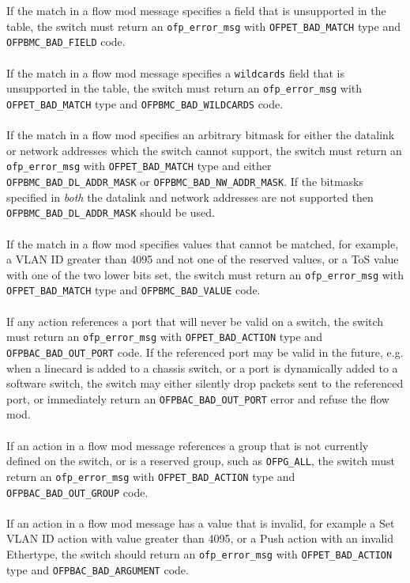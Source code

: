 \documentclass[10pt]{article}
\begin{document}
\\\\
If the match in a flow mod message specifies a field that is unsupported in the table, the switch must return an \verb|ofp_error_msg| with \verb|OFPET_BAD_MATCH| type and \verb|OFPBMC_BAD_FIELD| code.
\\\\
If the match in a flow mod message specifies a \verb|wildcards| field that is unsupported in the table, the switch must return an \verb|ofp_error_msg| with \verb|OFPET_BAD_MATCH| type and \verb|OFPBMC_BAD_WILDCARDS| code.
\\\\
If the match in a flow mod specifies an arbitrary bitmask for either the datalink or network addresses which the switch cannot support, the switch must return an \verb|ofp_error_msg| with \verb|OFPET_BAD_MATCH| type and either \verb|OFPBMC_BAD_DL_ADDR_MASK| or \verb|OFPBMC_BAD_NW_ADDR_MASK|. If the bitmasks specified in \emph{both} the datalink and network addresses are not supported then \verb|OFPBMC_BAD_DL_ADDR_MASK| should be used.
\\\\
If the match in a flow mod specifies values that cannot be matched, for example, a VLAN ID greater than 4095 and not one of the reserved values, or a ToS value with one of the two lower bits set, the switch must return an \verb|ofp_error_msg| with \verb|OFPET_BAD_MATCH| type and \verb|OFPBMC_BAD_VALUE| code.
\\\\
If any action references a port that will never be valid on a switch, the switch must return an \verb|ofp_error_msg| with \verb|OFPET_BAD_ACTION| type and \verb|OFPBAC_BAD_OUT_PORT| code.  If the referenced port may be valid in the future, e.g. when a linecard is added to a chassis switch, or a port is dynamically added to a software switch, the switch may either silently drop packets sent to the referenced port, or immediately return an \verb|OFPBAC_BAD_OUT_PORT| error and refuse the flow mod.
\\\\
If an action in a flow mod message references a group that is not currently defined on the switch, or is a reserved group, such as \verb|OFPG_ALL|, the switch must return an \verb|ofp_error_msg| with \verb|OFPET_BAD_ACTION| type and \verb|OFPBAC_BAD_OUT_GROUP| code.
\\\\
If an action in a flow mod message has a value that is invalid, for example a Set VLAN ID action with value greater than 4095, or a Push action with an invalid Ethertype, the switch should return an \verb|ofp_error_msg| with \verb|OFPET_BAD_ACTION| type and \verb|OFPBAC_BAD_ARGUMENT| code.
\end{document}
